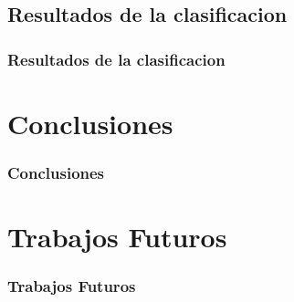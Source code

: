 \documentclass{beamer}
\begin{document}
\subsection{Resultados de la clasificacion}
\begin{frame}
\frametitle{Resultados de la clasificacion}
\end{frame}




\section{Conclusiones}

\begin{frame}
\frametitle{Conclusiones}
\end{frame}





\section{Trabajos Futuros}
\begin{frame}
\frametitle{Trabajos Futuros}
\end{frame}
\end{document}
